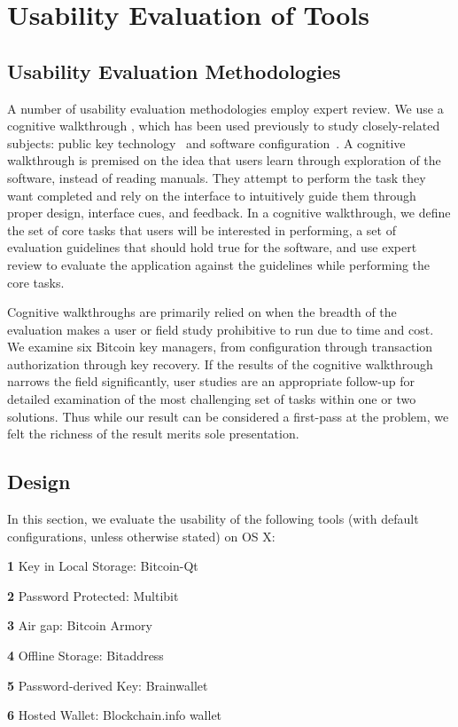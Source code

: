 
\section{Usability Evaluation of Tools}
\subsection{Usability Evaluation Methodologies}
A number of usability evaluation methodologies employ expert review. We use a cognitive walkthrough \cite{WRLP94}, which has been used previously to study closely-related subjects: public key technology~\cite{WT99} and software configuration~\cite{COA07}. A cognitive walkthrough is premised on the idea that users learn through exploration of the software, instead of reading manuals. They attempt to perform the task they want completed and rely on the interface to intuitively guide them through proper design, interface cues, and feedback. In a cognitive walkthrough, we define the set of core tasks that users will be interested in performing, a set of evaluation guidelines that should hold true for the software, and use expert review to evaluate the application against the guidelines while performing the core tasks. 

Cognitive walkthroughs are primarily relied on when the breadth of the evaluation makes a user or field study prohibitive to run due to time and cost. We examine six Bitcoin key managers, from configuration through transaction authorization through key recovery. If the results of the cognitive walkthrough narrows the field significantly, user studies are an appropriate follow-up for detailed examination of the most challenging set of tasks within one or two solutions. Thus while our result can be considered a first-pass at the problem, we felt the richness of the result merits sole presentation.

\subsection{Design}
In this section, we evaluate the usability of the following tools (with default configurations, unless otherwise stated) on OS X:

\begin{compactlist}
	\item[\bf 1] Key in Local Storage: Bitcoin-Qt
	\item[\bf 2] Password Protected: Multibit 
	\item[\bf 3] Air gap: Bitcoin Armory
	\item[\bf 4] Offline Storage: Bitaddress
	\item[\bf 5] Password-derived Key: Brainwallet
	\item[\bf 6] Hosted Wallet: Blockchain.info wallet
\end{compactlist}

